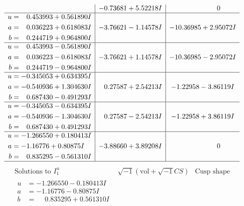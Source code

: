 \documentclass[1p]{elsarticle_modified}
\theoremstyle{definition}
\newcommand{\I}{\sqrt{-1}}
\begin{document}
$$\begin{array}{c|c|c}
 & -0.73681 + 5.52218 I & \phantom{-0.000000 } 0 \\ \hline\begin{aligned}
u &= \phantom{-}0.453993 + 0.561890 I \\
a &= \phantom{-}0.036223 + 0.618083 I \\
b &= \phantom{-}0.244719 + 0.964800 I\end{aligned}
 & -3.76621 - 1.14578 I & -10.36985 + 2.95072 I \\ \hline\begin{aligned}
u &= \phantom{-}0.453993 - 0.561890 I \\
a &= \phantom{-}0.036223 - 0.618083 I \\
b &= \phantom{-}0.244719 - 0.964800 I\end{aligned}
 & -3.76621 + 1.14578 I & -10.36985 - 2.95072 I \\ \hline\begin{aligned}
u &= -0.345053 + 0.634395 I \\
a &= -0.540936 + 1.304630 I \\
b &= \phantom{-}0.687430 - 0.491293 I\end{aligned}
 & \phantom{-}0.27587 + 2.54213 I & -1.22958 - 3.86119 I \\ \hline\begin{aligned}
u &= -0.345053 - 0.634395 I \\
a &= -0.540936 - 1.304630 I \\
b &= \phantom{-}0.687430 + 0.491293 I\end{aligned}
 & \phantom{-}0.27587 - 2.54213 I & -1.22958 + 3.86119 I \\ \hline\begin{aligned}
u &= -1.266550 + 0.180413 I \\
a &= -1.16776 + 0.80875 I \\
b &= \phantom{-}0.835295 - 0.561310 I\end{aligned}
 & -3.88660 + 3.89208 I & \phantom{-0.000000 } 0\\
 \hline 
 \end{array}$$\newpage$$\begin{array}{c|c|c}  
\text{Solutions to }I^u_{1}& \I (\text{vol} + \sqrt{-1}CS) & \text{Cusp shape}\\
 \hline 
\begin{aligned}
u &= -1.266550 - 0.180413 I \\
a &= -1.16776 - 0.80875 I \\
b &= \phantom{-}0.835295 + 0.561310 I\end{aligned}

\end{array}$$
\end{document}
